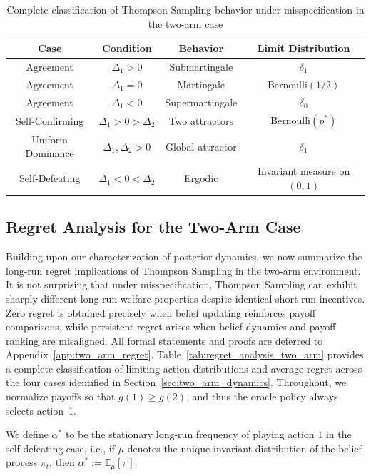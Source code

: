 \documentclass[12pt]{article}
\begin{document}
\begin{table}[H]
\centering
\begin{tabular}{|c|c|c|c|}
\hline
\textbf{Case} & \textbf{Condition} & \textbf{Behavior} & \textbf{Limit Distribution} \\
\hline
Agreement & $\Delta_1 > 0$ & Submartingale & $\delta_1$ \\
Agreement & $\Delta_1 = 0$ & Martingale & $\text{Bernoulli}(1/2)$ \\
Agreement & $\Delta_1 < 0$ & Supermartingale & $\delta_0$ \\
\hline
Self-Confirming & $\Delta_1 > 0 > \Delta_2$ & Two attractors & $\text{Bernoulli}(p^*)$ \\
Uniform Dominance & $\Delta_1, \Delta_2 > 0$ & Global attractor & $\delta_1$ \\
Self-Defeating & $\Delta_1 < 0 < \Delta_2$ & Ergodic & Invariant measure on $(0,1)$ \\
\hline
\end{tabular}
\caption{Complete classification of Thompson Sampling behavior under misspecification in the two-arm case}
\label{tab:classification_two_arm}
\end{table}


\subsection{Regret Analysis for the Two-Arm Case}
\label{sec:two_arm_regret}
Building upon our characterization of posterior dynamics, we now summarize the long-run regret implications of Thompson Sampling in the two-arm environment. It is not surprising that under misspecification, Thompson Sampling can exhibit sharply different long-run welfare properties despite identical short-run incentives. 
Zero regret is obtained precisely when belief updating reinforces payoff comparisons, while persistent regret arises when belief dynamics and payoff ranking are misaligned. All formal statements and proofs are deferred to Appendix~\ref{app:two_arm_regret}. Table~\ref{tab:regret_analysis_two_arm} provides a complete classification of limiting action distributions and average regret across the four cases identified in Section~\ref{sec:two_arm_dynamics}. 
Throughout, we normalize payoffs so that $g(1) \ge g(2)$, and thus the oracle policy always selects action~1.

We define $\alpha^*$ to be the stationary long-run frequency of playing action $1$ in the self-defeating case, i.e., if $\mu$ denotes the unique invariant distribution of the belief process $\pi_t$, then $\alpha^* := \mathbb{E}_{\mu}[\pi]$.
\end{document}
